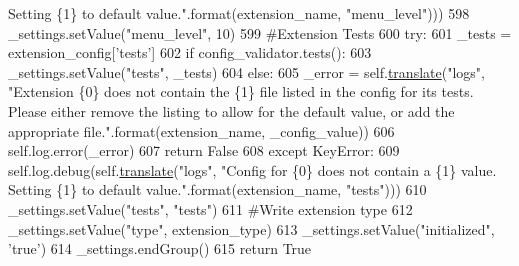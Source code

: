 \begin{DoxyCode}
{       Setting \{1\} to default value."}.format(extension\_name, \textcolor{stringliteral}{"menu\_level"})))
598             \_settings.setValue(\textcolor{stringliteral}{"menu\_level"}, 10)
599         \textcolor{comment}{#Extension Tests}
600         \textcolor{keywordflow}{try}:
601             \_tests = extension\_config[\textcolor{stringliteral}{'tests'}]
602             \textcolor{keywordflow}{if} config\_validator.tests():
603                 \_settings.setValue(\textcolor{stringliteral}{"tests"}, \_tests)
604             \textcolor{keywordflow}{else}:
605                 \_error = self.\hyperlink{classcommotion__client_1_1utils_1_1extension__manager_1_1ExtensionManager_a2cfd032ca383c3fd6f0f52b99b6dd67c}{translate}(\textcolor{stringliteral}{"logs"}, \textcolor{stringliteral}{"Extension \{0\} does not contain the \{1\} file
       listed in the config for its tests. Please either remove the listing to allow for the default value, or add the
       appropriate file."}.format(extension\_name, \_config\_value))
606                 self.log.error(\_error)
607                 \textcolor{keywordflow}{return} \textcolor{keyword}{False}
608         \textcolor{keywordflow}{except} KeyError:
609             self.log.debug(self.\hyperlink{classcommotion__client_1_1utils_1_1extension__manager_1_1ExtensionManager_a2cfd032ca383c3fd6f0f52b99b6dd67c}{translate}(\textcolor{stringliteral}{"logs"}, \textcolor{stringliteral}{"Config for \{0\} does not contain a \{1\} value.
       Setting \{1\} to default value."}.format(extension\_name, \textcolor{stringliteral}{"tests"})))
610             \_settings.setValue(\textcolor{stringliteral}{"tests"}, \textcolor{stringliteral}{"tests"})
611         \textcolor{comment}{#Write extension type}
612         \_settings.setValue(\textcolor{stringliteral}{"type"}, extension\_type)
613         \_settings.setValue(\textcolor{stringliteral}{"initialized"}, \textcolor{stringliteral}{'true'})
614         \_settings.endGroup()
615         \textcolor{keywordflow}{return} \textcolor{keyword}{True}

\end{DoxyCode}
